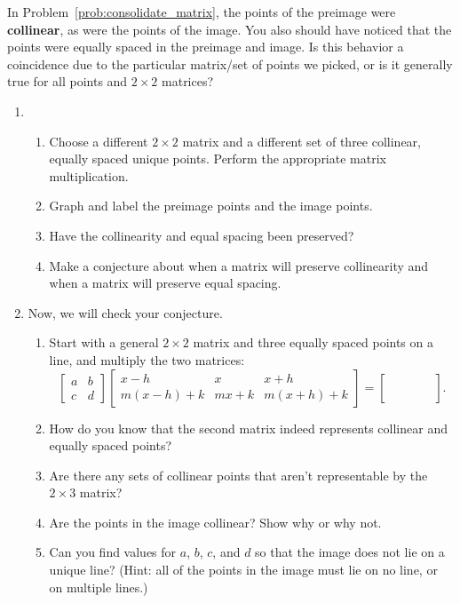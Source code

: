 \documentclass[../textbook.tex]{subfiles}
\begin{document}
\noindent In Problem~\ref{prob:consolidate_matrix}, the points of the preimage were \textbf{collinear}, as were the points of the image. You also should have noticed that the points were equally spaced in the preimage and image. Is this behavior a coincidence due to the particular matrix/set of points we picked, or is it generally true for all points and $2\times 2$ matrices?

\begin{enumerate}
\setcounter{enumi}{\value{problem_i}}
\item \begin{enumerate}
\item Choose a different $2\times 2$ matrix and a different set of three collinear, equally spaced unique points. Perform the appropriate matrix multiplication.
\item Graph and label the preimage points and the image points.
\item Have the collinearity and equal spacing been preserved?
\item Make a conjecture about when a matrix will preserve collinearity and when a matrix will preserve equal spacing.
\end{enumerate}
\item Now, we will check your conjecture.
\begin{enumerate}
\item Start with a general $2\times 2$ matrix and three equally spaced points on a line, and multiply the two matrices:
$$\left[\begin{array}{cc}a & b \\ c & d\end{array}\right]
\left[\begin{array}{ccc}x-h & x & x+h \\ m(x-h)+k & mx+k & m(x+h)+k\end{array}\right]=
\left[\begin{array}{ccc}\phantom{0} & \phantom{0} & \phantom{0} \\ \phantom{0} \end{array}\right].$$
\item How do you know that the second matrix indeed represents collinear and equally spaced points?
\item Are there any sets of collinear points that aren't representable by the $2\times 3$ matrix?
\item Are the points in the image collinear? Show why or why not.
\item Can you find values for $a$, $b$, $c$, and $d$ so that the image does not lie on a unique line? (Hint: all of the points in the image must lie on no line, or on multiple lines.)

\end{enumerate}
\end{enumerate}
\end{document}
